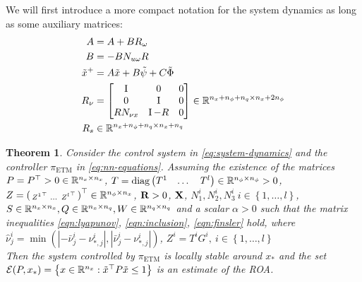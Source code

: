 \documentclass{ifacconf}
\theoremstyle{plain}
\newtheorem{theorem}{Theorem}
\begin{document}
We will first introduce a more compact notation for the system dynamics as long as some auxiliary matrices:
\begin{equation}\label{eqn:auxiliary}
\begin{aligned}
    \relax{A} &= A + B R_{\omega}\\
    \relax{B} &= -B N_{u \omega} R\\
    \tilde{x}^+ &= \relax{A}\tilde{x} + \relax{B}\tilde{\psi} + C \tilde{\Phi}\\
R_{\nu} &= \left[\begin{matrix}
  \operatorname{I} & 0 & 0 \\
  0 & \operatorname{I} & 0 \\
  R N_{\nu x} & \operatorname{I} - R & 0\\
\end{matrix}\right] \in {\mathbb{R}}^{n_x + n_{\phi} + n_q \times n_x + 2 n_{\phi}}\\
R_s &\in {\mathbb{R}}^{n_x + n_{\phi} + n_q \times n_x + n_q}
\end{aligned}
\end{equation}

\begin{theorem} \emph{ Consider the control system in \eqref{eq:system-dynamics} and the controller $\pi_{\text{ETM}}$ in \eqref{eq:nn-equations}. Assuming the existence of the matrices $P = P^\top > 0 \in {\mathbb{R}}^{n_x \times n_x}$,} $T = \text{diag} \left(\begin{matrix}T^1 & \dots & T^l\end{matrix}\right) \in {\mathbb{R}}^{n_{\phi} \times n_{\phi}} > 0$, \emph{$Z = \left(\begin{smallmatrix} {Z^1}^\top & \dots & {Z^l}^\top \end{smallmatrix} \right)^\top \in {\mathbb{R}}^{n_{\phi} \times n_x}$, ${\bf{R}} > 0$, ${\bf{X}}$, $N^i_1, N^i_2, N^i_3 \ i \in \left\{ 1, \dots, l \right\}$, $S \in {\mathbb{R}}^{n_x \times n_x}, Q \in {\mathbb{R}}^{n_x \times n_q}, W \in {\mathbb{R}}^{n_q \times n_q}$ and a scalar $\alpha > 0$ such that the matrix inequalities \eqref{eqn:lyapunov}, \eqref{eqn:inclusion}, \eqref{eqn:finsler} hold, where $\hat{\nu}_j^i = \min(|-\bar{\nu}_j^i - \nu^i_{*, j}|,|\bar{\nu}_j^i - \nu^i_{*, j}|)$, $Z^i = T^i G^i,\ i \in \left\{ 1, \dots, l \right\}$\\
Then the system controlled by $\pi_{\text{ETM}}$ is locally stable around $x_*$ and the set ${\mathcal{E}}(P, x_*) = \left\{ x \in {\mathbb{R}}^{n_x} : \tilde{x}^\top P \tilde{x} \leq 1\right\}$ is an estimate of the ROA.}
\end{theorem}
\end{document}
